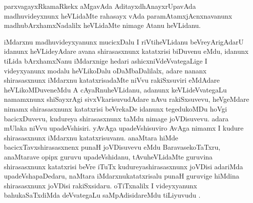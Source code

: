 \begin{artha}
parxvagayxRkamaRkekx aMgavAda AditayxdhAnayxrUpavAda madhuvideyxnunx heVLidaMte rahasayx vAda paramAtamxjAcnxnavanunx madhubArxhamxNadalilx heVLidaMte nimage Atanu heVLidanu.
\end{artha}

\begin{center}
\end{center}

\begin{artha}
iMdarxnu madhuvideyxyanunx mucicxDalu I riVtiheVLidanu beVreyArigAdarU idanunx heVLideyAdare avana shirasasxnunx katatxrisi biDuvenu eMdu, idanunx tiLida bArxhamxNanu iMdarxnige hedari ashicxniVdeVvategaLige I videyxyanunx modalu heVLikoDalu oDaMbaDalilalx, adare nananx shirasasxnunx iMdarxnu katatxrisadaMte niVvu rakiSxsuviri eMdAdare heVLikoMDuveneMdu A cAyaRnuheVLidanu, adanunx keVLideVvategaLu namamxnunx shiSayxrAgi sivxVkarisuvudAdare nAvu rakiSxsuvevu, heVgeMdare nimamx shirasasxnunx katatxrisi beVrekaDe idanunx tegedukoMDu hoVgi bacicxDuvevu, kudureya shirasasxnunx taMdu nimage joVDisuvevu. adara mUlaka niVvu upadeVshisiri. yAvAga upadeVshisuviro AvAga nimamx I kudure shirasasxnunx iMdarxnu katatxrisuvanu. anaMtara hiMde bacicxTavxshirasasxnenx punaH joVDisuvevu eMdu BaravasekoTaTxru, anaMtarave opipx guruvu upadeVshidanu, tAvuheVLidaMte guruvina shirasasxnunx katatxrisi beVre iTuTx kudureyashirasasxnunx joVDisi adariMda upadeVshapaDedaru, naMtara iMdarxnukatatxrisalu punaH guruvige  hiMdina shirasasxnunx joVDisi rakiSxsidaru. oTiTxnalilx I videyxyanunx bahukaSaTxdiMda deVvategaLu saMpAdisidareMdu tiLiyuvudu .
\end{artha}


